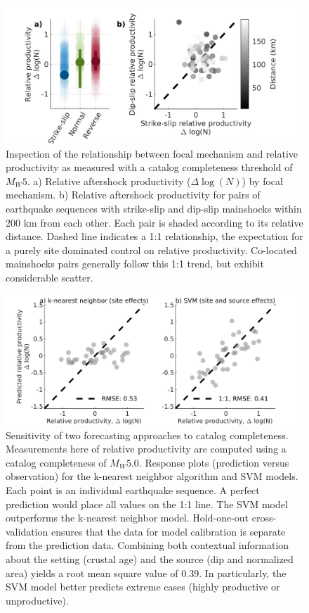 \documentclass[draft]{agujournal}
\begin{document}
\begin{figure}[H]
\centering
\includegraphics{figures/fmspairs_mw5.png}
\caption{Inspection of the relationship between focal mechanism and relative productivity as measured with a catalog completeness threshold of $M_W5$. a) Relative aftershock productivity ($\Delta \log(N)$) by focal mechanism. b) Relative aftershock productivity for pairs of earthquake sequences with strike-slip and dip-slip mainshocks within 200 km from each other. Each pair is shaded according to its relative distance. Dashed line indicates a 1:1 relationship, the expectation for a purely site dominated control on relative productivity. Co-located mainshocks pairs generally follow this 1:1 trend, but exhibit considerable scatter.}
\end{figure}

\begin{figure}[H]
\centering
\includegraphics{figures/response_mw5.png}
\caption{Sensitivity of two forecasting approaches to catalog completeness. Measurements here of relative productivity are computed using a catalog completeness of $M_W5.0$. Response plots (prediction versus observation) for the k-nearest neighbor algorithm and SVM models. Each point is an individual earthquake sequence. A perfect prediction would place all values on the 1:1 line. The SVM model outperforms the k-nearest neighbor model. Hold-one-out cross-validation ensures that the data for model calibration is separate from the prediction data. Combining both contextual information about the setting (crustal age) and the source (dip and normalized area) yields a root mean square value of 0.39. In particularly, the SVM model better predicts extreme cases (highly productive or unproductive).}
\label{fig:response}
\end{figure}
\end{document}
